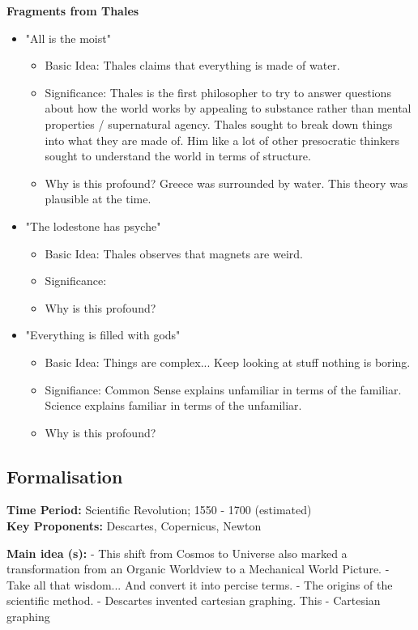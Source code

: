 \documentclass[twoside]{article}
\begin{document}
\textbf{Fragments from Thales}
\begin{itemize}
  \item "All is the moist"
    \begin{itemize}
      \item Basic Idea: Thales claims that everything is made of water.
      \item Significance: Thales is the first philosopher to try to answer questions
            about how the world works by appealing to substance rather than mental
            properties / supernatural agency. Thales sought to break down things into
            what they are made of. Him like a lot of other presocratic thinkers
            sought to understand the world in terms of structure.
      \item Why is this profound? Greece was surrounded by water. This theory
            was plausible at the time.
    \end{itemize}
  \item "The lodestone has psyche"
    \begin{itemize}
      \item Basic Idea: Thales observes that magnets are weird.
      \item Significance:
      \item Why is this profound?
    \end{itemize}
  \item "Everything is filled with gods"
    \begin{itemize}
      \item Basic Idea: Things are complex... Keep looking at stuff nothing is boring.
      \item Signifiance: Common Sense explains unfamiliar in terms of the familiar.
      Science explains familiar in terms of the unfamiliar.
      \item Why is this profound?
    \end{itemize}
\end{itemize}

\subsection{Formalisation}
\textbf{Time Period: } Scientific Revolution; 1550 - 1700 (estimated) \\
\textbf{Key Proponents: } Descartes, Copernicus, Newton

\textbf{Main idea (s): }
- This shift from Cosmos to Universe also marked a transformation from an Organic
Worldview to a Mechanical World Picture.
- Take all that wisdom... And convert it into percise terms.
- The origins of the scientific method.
- Descartes invented cartesian graphing. This
- Cartesian graphing
\end{document}
